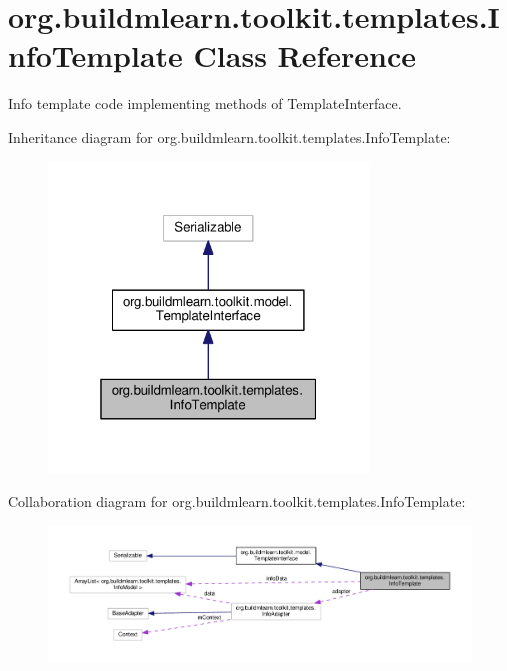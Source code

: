 \hypertarget{classorg_1_1buildmlearn_1_1toolkit_1_1templates_1_1InfoTemplate}{}\section{org.\+buildmlearn.\+toolkit.\+templates.\+Info\+Template Class Reference}
\label{classorg_1_1buildmlearn_1_1toolkit_1_1templates_1_1InfoTemplate}


Info template code implementing methods of Template\+Interface.  




Inheritance diagram for org.\+buildmlearn.\+toolkit.\+templates.\+Info\+Template\+:
\nopagebreak
\begin{figure}[H]
\begin{center}
\leavevmode
\includegraphics[width=241pt]{classorg_1_1buildmlearn_1_1toolkit_1_1templates_1_1InfoTemplate__inherit__graph}
\end{center}
\end{figure}


Collaboration diagram for org.\+buildmlearn.\+toolkit.\+templates.\+Info\+Template\+:
\nopagebreak
\begin{figure}[H]
\begin{center}
\leavevmode
\includegraphics[width=350pt]{classorg_1_1buildmlearn_1_1toolkit_1_1templates_1_1InfoTemplate__coll__graph}
\end{center}
\end{figure}
